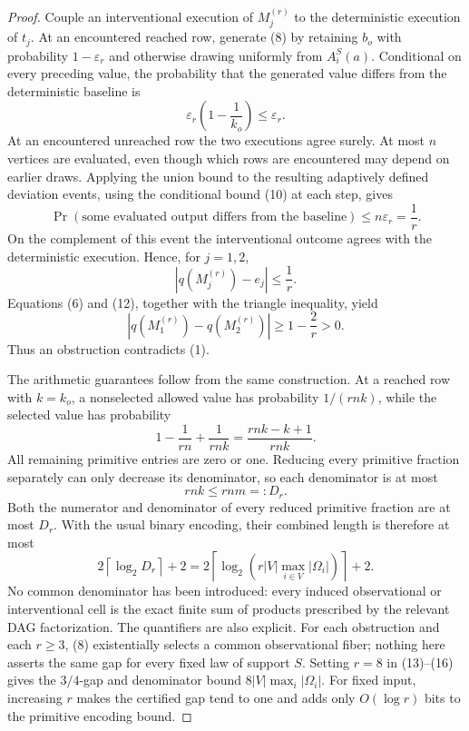\documentclass{article}
\begin{document}
\begin{proof}
Couple an interventional execution of \(M_j^{(r)}\) to the deterministic execution of \(t_j\).  At an encountered reached row, generate (8) by retaining \(b_o\) with probability \(1-\varepsilon_r\) and otherwise drawing uniformly from \(A_i^S(a)\).  Conditional on every preceding value, the probability that the generated value differs from the deterministic baseline is
\[
 \varepsilon_r\left(1-\frac{1}{k_o}\right)\leq\varepsilon_r.
 \tag{10}
\]
At an encountered unreached row the two executions agree surely.  At most \(n\) vertices are evaluated, even though which rows are encountered may depend on earlier draws.  Applying the union bound to the resulting adaptively defined deviation events, using the conditional bound (10) at each step, gives
\[
 \Pr(\text{some evaluated output differs from the baseline})
 \leq n\varepsilon_r=\frac1r.
 \tag{11}
\]
On the complement of this event the interventional outcome agrees with the deterministic execution.  Hence, for \(j=1,2\),
\[
 |q(M_j^{(r)})-e_j|\leq\frac1r.
 \tag{12}
\]
Equations (6) and (12), together with the triangle inequality, yield
\[
 |q(M_1^{(r)})-q(M_2^{(r)})|
 \geq 1-\frac2r>0.
 \tag{13}
\]
Thus an obstruction contradicts (1).

The arithmetic guarantees follow from the same construction.  At a reached row with \(k=k_o\), a nonselected allowed value has probability \(1/(rnk)\), while the selected value has probability
\[
 1-\frac1{rn}+\frac1{rnk}
 =\frac{rnk-k+1}{rnk}.
 \tag{14}
\]
All remaining primitive entries are zero or one.  Reducing every primitive fraction separately can only decrease its denominator, so each denominator is at most
\[
 rnk\leq rnm=:D_r.
 \tag{15}
\]
Both the numerator and denominator of every reduced primitive fraction are at most \(D_r\).  With the usual binary encoding, their combined length is therefore at most
\[
 2\left\lceil\log_2D_r\right\rceil+2
 =2\left\lceil\log_2\!\left(r|V|\max_{i\in V}|\Omega_i|\right)\right\rceil+2.
 \tag{16}
\]
No common denominator has been introduced: every induced observational or interventional cell is the exact finite sum of products prescribed by the relevant DAG factorization.  The quantifiers are also explicit.  For each obstruction and each \(r\geq3\), (8) existentially selects a common observational fiber; nothing here asserts the same gap for every fixed law of support \(S\).  Setting \(r=8\) in (13)--(16) gives the \(3/4\)-gap and denominator bound \(8|V|\max_i|\Omega_i|\).  For fixed input, increasing \(r\) makes the certified gap tend to one and adds only \(O(\log r)\) bits to the primitive encoding bound.


\end{proof}
\end{document}
